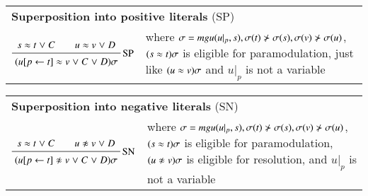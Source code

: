\medskip

\begin{tabular}{m{}m{}}
    \multicolumn{2}{l}{{\bf Superposition into positive literals} (SP)} \\[\jot]
    $\namedinference{SP}{s \eq t \llor C \qquad u \eq v \llor D}{(u[p \leftarrow t] \eq v \llor C \llor D)\sigma}$ 
        & where $\sigma = \mathit{mgu}(u|_p, s), \sigma(t) \not\succ \sigma(s), \sigma(v) \not\succ \sigma(u)$,
        $(s \approx t)\sigma$ is eligible for paramodulation, just like $(u \approx v)\sigma$ and $u|_p$ is not a variable
\end{tabular}

\medskip

\begin{tabular}{m{}m{}}
    \multicolumn{2}{l}{{\bf Superposition into negative literals} (SN)} \\[\jot]
    $\namedinference{SN}{s \eq t \llor C \qquad u \noteq v \llor D}{(u[p \leftarrow t] \noteq v \llor C \llor D)\sigma}$ 
        & where $\sigma = \mathit{mgu}(u|_p, s), \sigma(t) \not\succ \sigma(s), \sigma(v) \not\succ \sigma(u)$,
         $(s \approx t)\sigma$ is eligible for paramodulation, $(u \noteq v)\sigma$ is eligible for resolution, and $u|_p$ is not a variable
\end{tabular}





